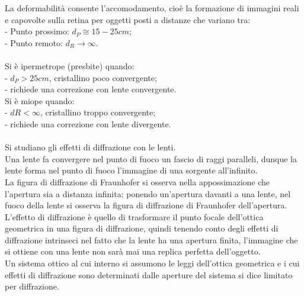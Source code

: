 \documentclass{article}
\begin{document}
La deformabilità consente l’accomodamento, cioè la formazione di immagini reali e capovolte sulla retina per oggetti posti a distanze che variano tra:\\
- Punto prossimo: $d_P \cong 15-25 cm$;\\
- Punto remoto: $d_R \rightarrow\infty$.\\
\\
Si è ipermetrope (presbite) quando:\\
- $d_P > 25 cm$, cristallino poco convergente;\\
- richiede una correzione con lente convergente.\\
Si è miope quando:\\
- $dR < \infty$, cristallino troppo convergente;\\
- richiede una correzione con lente divergente.\\
\\
Si studiano gli effetti di diffrazione con le lenti.\\
Una lente fa convergere nel punto di fuoco un fascio di raggi paralleli, dunque la lente forma nel punto di fuoco l’immagine di una sorgente all’infinito.\\
La figura di diffrazione di Fraunhofer si osserva nella appossimazione che l’apertura sia a distanza infinita: ponendo un’apertura davanti a una lente, nel fuoco della lente si osserva la figura di diffrazione di Fraunhofer dell’apertura.\\
L’effetto di diffrazione è quello di trasformare il punto focale dell’ottica geometrica in una figura di diffrazione, quindi tenendo conto degli effetti di diffrazione intrinseci nel fatto che la lente ha una apertura finita, l’immagine che si ottiene con una lente non sarà mai una replica perfetta dell’oggetto.\\
Un sistema ottico al cui interno si assumono le leggi dell’ottica geometrica e i cui effetti di diffrazione sono determinati dalle aperture del sistema si dice limitato per diffrazione.\\
\end{document}
